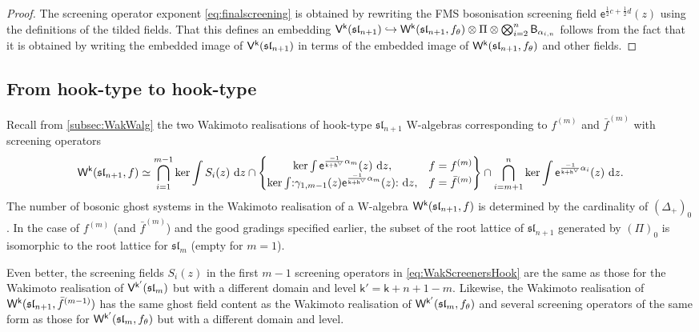 \documentclass[10pt,a4paper]{amsart}
\numberwithin{equation}{section}
\renewcommand{\cong}{\simeq} %
\newcommand{\dd}{\mathrm{d}}   %
\newcommand{\ee}{\mathsf{e}}   %
\newcommand{\kk}{\mathsf{k}}   %
\DeclarePairedDelimiter{\brac}{\lparen}{\rparen}   %
\newcommand{\no}[1]{\mathopen{:} #1 \mathclose{:}} %
\newcommand{\alg}[1]{\mathfrak{#1}}  %
\newcommand{\VOA}[1]{\mathsf{#1}}    %
\newcommand{\SLA}[2]{\alg{#1}_{#2}}                      %
\newcommand{\slnpone}{\SLA{sl}{n+1}}
\newcommand{\cox}{\mathsf{h}}                                        %
\newcommand{\dcox}{\coroot{\cox}}                                    %
\newcommand{\proots}{\Delta_+}                                       %
\newcommand{\sroots}{\Pi}                                            %
\newcommand{\sroot}[1]{\alpha_{#1}}                                  %
\newcommand{\coroot}[1]{#1^{\vee}}                                   %
\newcommand{\fmin}{f_\theta}                                        %
\newcommand{\fhook}[1]{f^{(#1)}}                                  %
\newcommand{\Wsymb}{\VOA{W}}
\newcommand{\uaffvoa}[2]{\VOA{V}^{#1}\brac{#2}}                   %
\newcommand{\bgvoa}{\VOA{B}}                                      %
\newcommand{\uQHR}[3]{\Wsymb^{#1}\brac{#2,#3}}                    %
\theoremstyle{plain}
\begin{document}
\begin{proof}
The screening operator exponent \eqref{eq:finalscreening} is obtained by rewriting the FMS bosonisation screening field $\ee^{\frac{1}{2}c + \frac{1}{2}d}(z)$ using the definitions of the tilded fields. That this defines an embedding $\uaffvoa{\kk}{\slnpone} \hookrightarrow \uQHR{\kk}{\slnpone}{\fmin}\otimes \Pi \otimes \bigotimes_{i=2}^{n} \bgvoa_{\sroot{i,n}} $ follows from the fact that it is obtained by writing the embedded image of $\uaffvoa{\kk}{\slnpone}$ in terms of the embedded image of $\uQHR{\kk}{\slnpone}{\fmin}$ and other fields.
\end{proof}

\subsection{From hook-type to hook-type} \label{subsec:HooktoHook}
Recall from \cref{subsec:WakWalg} the two Wakimoto realisations of hook-type $\slnpone$ W-algebras corresponding to $\fhook{m}$ and $\bar{f}^{(m)}$ with screening operators 
%
\begin{equation} \label{eq:WakScreenersHook}
    \uQHR{\kk}{\slnpone}{f} \cong \bigcap_{i=1}^{m-1} \textup{ker} \int S_i(z) \ \dd z \cap 
    \left\{\begin{matrix}
        \textup{ker} \int \ee^{\frac{-1}{\kk+\dcox} \alpha_{m}}(z) \ \dd z, & f=\fhook{m} \\
        \textup{ker} \int \no{\gamma_{1,m-1}(z) \ee^{\frac{-1}{\kk+\dcox} \alpha_{m}}(z)} \ \dd z, & f=\bar{f}^{(m)}
    \end{matrix}\right\} \cap \bigcap_{i=m+1}^{n} \textup{ker} \int \ee^{\frac{-1}{\kk+\dcox} \alpha_{i}}(z) \ \dd z. 
\end{equation}
%
The number of bosonic ghost systems in the Wakimoto realisation of a W-algebra $ \uQHR{\kk}{\slnpone}{f}$ is determined by the cardinality of $(\proots)_0$. In the case of $\fhook{m}$ (and $\bar{f}^{(m)}$) and the good gradings specified earlier, the subset of the root lattice of $\slnpone$ generated by $(\sroots)_0$ is isomorphic to the root lattice for $\SLA{sl}{m}$ (empty for $m=1$). 

Even better, the screening fields $S_i(z)$ in the first $m-1$ screening operators in \eqref{eq:WakScreenersHook} are the same as those for the Wakimoto realisation of $\uaffvoa{\kk'}{\SLA{sl}{m}}$ but with a different domain and level $\kk'=\kk+n+1-m$. Likewise, the Wakimoto realisation of $\uQHR{\kk}{\slnpone}{\bar{f}^{(m-1)}}$ has the same ghost field content as the Wakimoto realisation of $\uQHR{\kk'}{\SLA{sl}{m}}{f_\theta}$ and several screening operators of the same form as those for $\uQHR{\kk'}{\SLA{sl}{m}}{f_\theta}$ but with a different domain and level. 
\end{document}
